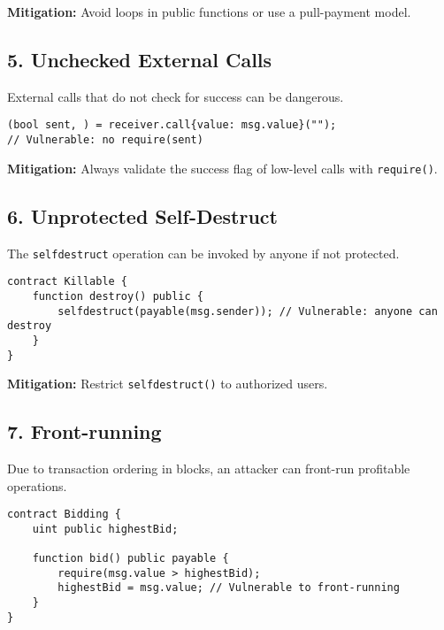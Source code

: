 \textbf{Mitigation:} Avoid loops in public functions or use a pull-payment model.

\subsection*{5. Unchecked External Calls}

External calls that do not check for success can be dangerous.

\begin{lstlisting}[language=Solidity, caption={Unchecked call}, label={lst:unchecked_call}, captionpos=b]
(bool sent, ) = receiver.call{value: msg.value}("");
// Vulnerable: no require(sent)
\end{lstlisting}

\textbf{Mitigation:} Always validate the success flag of low-level calls with \texttt{require()}.

\subsection*{6. Unprotected Self-Destruct}

The \texttt{selfdestruct} operation can be invoked by anyone if not protected.

\begin{lstlisting}[language=Solidity, caption={Unprotected self-destruct}, label={lst:selfdestruct}, captionpos=b]
contract Killable {
    function destroy() public {
        selfdestruct(payable(msg.sender)); // Vulnerable: anyone can destroy
    }
}
\end{lstlisting}

\textbf{Mitigation:} Restrict \texttt{selfdestruct()} to authorized users.

\subsection*{7. Front-running}

Due to transaction ordering in blocks, an attacker can front-run profitable operations.

\begin{lstlisting}[language=Solidity, caption={Front-running opportunity}, label={lst:frontrun}, captionpos=b]
contract Bidding {
    uint public highestBid;

    function bid() public payable {
        require(msg.value > highestBid);
        highestBid = msg.value; // Vulnerable to front-running
    }
}
\end{lstlisting}

